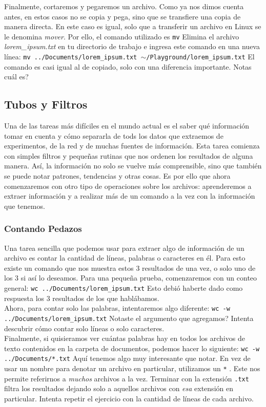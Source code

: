 \documentclass[10pt,letterpaper]{article}
\newcommand{\inlinecode}[1]{
\colorbox{light-gray}{\texttt{#1}}
}
\begin{document}
Finalmente, cortaremos y pegaremos un archivo. Como ya nos dimos cuenta antes, en estos casos no se copia y pega, sino que se transfiere una copia de manera directa. En este caso es igual, solo que a transferir un archivo en Linux se le denomina \emph{mover}. Por ello, el comando utilizado es \inlinecode{mv} Elimina el archivo \emph{lorem\_ipsum.txt} en tu directorio de trabajo e ingresa este comando en una nueva l\'inea: \inlinecode{mv ../Documents/lorem\_ipsum.txt $ \sim $/Playground/lorem\_ipsum.txt} El comando es casi igual al de copiado, solo con una diferencia importante. Notas cu\'al es?

\subsection{Tubos y Filtros}
Una de las tareas m\'as dif\'iciles en el mundo actual es el saber qu\'e informaci\'on tomar en cuenta y c\'omo separarla de tods los datos que extraemos de experimentos, de la red y de muchas fuentes de informaci\'on. Esta tarea comienza con simples filtros y peque\~nas rutinas que nos ordenen los resultados de alguna manera. As\'i, la informaci\'on no solo se vuelve m\'as comprensible, sino que tambi\'en se puede notar patrones, tendencias y otras cosas. Es por ello que ahora comenzaremos con otro tipo de operaciones sobre los archivos: aprenderemos a extraer informaci\'on y a realizar m\'as de un comando a la vez con la informaci\'on que tenemos.

\subsubsection{Contando Pedazos}
Una tarea sencilla que podemos usar para extraer algo de informaci\'on de un archivo es contar la cantidad de l\'ineas, palabras o caracteres en \'el. Para esto existe un comando que nos muestra estos 3 resultados de una vez, o solo uno de los 3 si as\'i lo deseamos. Para una peque\~na prueba, comenzaremos con un conteo general: \inlinecode{wc ../Documents/lorem\_ipsum.txt} Esto debi\'o haberte dado como respuesta los 3 resultados de los que habl\'abamos.\\

Ahora, para contar solo las palabras, intentaremos algo diferente: \inlinecode{wc -w ../Documents/lorem\_ipsum.txt} Notaste el argumento que agregamos? Intenta descubrir c\'omo contar solo l\'ineas o solo caracteres.\\

Finalmente, si quisieramos ver cu\'antas palabras hay en todos los archivos de texto contenidos en la carpeta de documentos, podemos hacer lo siguiente: \inlinecode{wc -w ../Documents/*.txt} Aqu\'i tenemos algo muy interesante que notar. En vez de usar un nombre para denotar un archivo en particular, utilizamos un \inlinecode{*}. Este nos permite referirnos a \emph{muchos} archivos a la vez. Terminar con la extensi\'on \inlinecode{.txt} filtra los resultados dejando solo a aquellos archivos con \emph{esa} extensi\'on en particular. Intenta repetir el ejercicio con la cantidad de l\'ineas de cada archivo.
\end{document}
